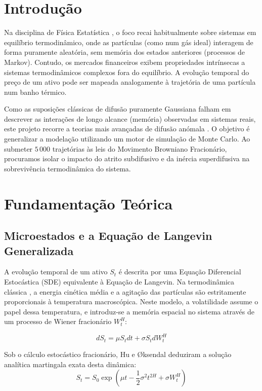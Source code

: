 \documentclass[11pt, a4paper]{article}
\begin{document}
\vspace{0.5cm}

\section{Introdução}
Na disciplina de Física Estatística \cite{sebenta}, o foco recai habitualmente sobre sistemas em equilíbrio termodinâmico, onde as partículas (como num gás ideal) interagem de forma puramente aleatória, sem memória dos estados anteriores (processos de Markov). Contudo, os mercados financeiros exibem propriedades intrínsecas a sistemas termodinâmicos complexos fora do equilíbrio. A evolução temporal do preço de um ativo pode ser mapeada analogamente à trajetória de uma partícula num banho térmico. 

Como as suposições clássicas de difusão puramente Gaussiana falham em descrever as interações de longo alcance (memória) observadas em sistemas reais, este projeto recorre a teorias mais avançadas de difusão anómala \cite{metzler2014}. O objetivo é generalizar a modelação utilizando um motor de simulação de Monte Carlo. Ao submeter $5\,000$ trajetórias às leis do Movimento Browniano Fracionário, procuramos isolar o impacto do atrito subdifusivo e da inércia superdifusiva na sobrevivência termodinâmica do sistema.

\section{Fundamentação Teórica}

\subsection{Microestados e a Equação de Langevin Generalizada}
A evolução temporal de um ativo $S_t$ é descrita por uma Equação Diferencial Estocástica (SDE) equivalente à Equação de Langevin. Na termodinâmica clássica \cite{sebenta}, a energia cinética média e a agitação das partículas são estritamente proporcionais à temperatura macroscópica. Neste modelo, a volatilidade assume o papel dessa temperatura, e introduz-se a memória espacial no sistema através de um processo de Wiener fracionário $W_t^H$:

\begin{equation}
dS_t = \mu S_t dt + \sigma S_t dW_t^H
\end{equation}

Sob o cálculo estocástico fracionário, Hu e \O{}ksendal \cite{hu2003} deduziram a solução analítica martingala exata desta dinâmica:
\begin{equation}
S_t = S_0 \exp\left(\mu t - \frac{1}{2}\sigma^2 t^{2H} + \sigma W_t^H\right)
\end{equation}
\end{document}
